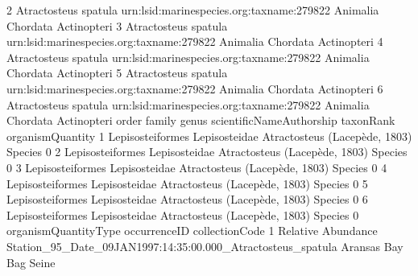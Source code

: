 \documentclass[
]{book}
\newenvironment{Shaded}{\begin{snugshade}}{\end{snugshade}}
\newcommand{\DecValTok}[1]{\textcolor[rgb]{0.00,0.00,0.81}{#1}}
\newcommand{\FloatTok}[1]{\textcolor[rgb]{0.00,0.00,0.81}{#1}}
\newcommand{\FunctionTok}[1]{\textcolor[rgb]{0.00,0.00,0.00}{#1}}
\newcommand{\NormalTok}[1]{#1}
\newcommand{\SpecialCharTok}[1]{\textcolor[rgb]{0.00,0.00,0.00}{#1}}
\begin{document}
\begin{Shaded}
\begin{Highlighting}[]
\DecValTok{2}\NormalTok{ Atractosteus spatula urn}\SpecialCharTok{:}\NormalTok{lsid}\SpecialCharTok{:}\NormalTok{marinespecies.org}\SpecialCharTok{:}\NormalTok{taxname}\SpecialCharTok{:}\DecValTok{279822}\NormalTok{ Animalia Chordata Actinopteri}
\DecValTok{3}\NormalTok{ Atractosteus spatula urn}\SpecialCharTok{:}\NormalTok{lsid}\SpecialCharTok{:}\NormalTok{marinespecies.org}\SpecialCharTok{:}\NormalTok{taxname}\SpecialCharTok{:}\DecValTok{279822}\NormalTok{ Animalia Chordata Actinopteri}
\DecValTok{4}\NormalTok{ Atractosteus spatula urn}\SpecialCharTok{:}\NormalTok{lsid}\SpecialCharTok{:}\NormalTok{marinespecies.org}\SpecialCharTok{:}\NormalTok{taxname}\SpecialCharTok{:}\DecValTok{279822}\NormalTok{ Animalia Chordata Actinopteri}
\DecValTok{5}\NormalTok{ Atractosteus spatula urn}\SpecialCharTok{:}\NormalTok{lsid}\SpecialCharTok{:}\NormalTok{marinespecies.org}\SpecialCharTok{:}\NormalTok{taxname}\SpecialCharTok{:}\DecValTok{279822}\NormalTok{ Animalia Chordata Actinopteri}
\DecValTok{6}\NormalTok{ Atractosteus spatula urn}\SpecialCharTok{:}\NormalTok{lsid}\SpecialCharTok{:}\NormalTok{marinespecies.org}\SpecialCharTok{:}\NormalTok{taxname}\SpecialCharTok{:}\DecValTok{279822}\NormalTok{ Animalia Chordata Actinopteri}
\NormalTok{             order        family        genus scientificNameAuthorship taxonRank organismQuantity}
\DecValTok{1}\NormalTok{ Lepisosteiformes Lepisosteidae }\FunctionTok{Atractosteus}\NormalTok{         (Lacepède, }\DecValTok{1803}\NormalTok{)   Species                }\DecValTok{0}
\DecValTok{2}\NormalTok{ Lepisosteiformes Lepisosteidae }\FunctionTok{Atractosteus}\NormalTok{         (Lacepède, }\DecValTok{1803}\NormalTok{)   Species                }\DecValTok{0}
\DecValTok{3}\NormalTok{ Lepisosteiformes Lepisosteidae }\FunctionTok{Atractosteus}\NormalTok{         (Lacepède, }\DecValTok{1803}\NormalTok{)   Species                }\DecValTok{0}
\DecValTok{4}\NormalTok{ Lepisosteiformes Lepisosteidae }\FunctionTok{Atractosteus}\NormalTok{         (Lacepède, }\DecValTok{1803}\NormalTok{)   Species                }\DecValTok{0}
\DecValTok{5}\NormalTok{ Lepisosteiformes Lepisosteidae }\FunctionTok{Atractosteus}\NormalTok{         (Lacepède, }\DecValTok{1803}\NormalTok{)   Species                }\DecValTok{0}
\DecValTok{6}\NormalTok{ Lepisosteiformes Lepisosteidae }\FunctionTok{Atractosteus}\NormalTok{         (Lacepède, }\DecValTok{1803}\NormalTok{)   Species                }\DecValTok{0}
\NormalTok{  organismQuantityType                                                occurrenceID        collectionCode}
\DecValTok{1}\NormalTok{   Relative Abundance Station\_95\_Date\_09JAN1997}\SpecialCharTok{:}\DecValTok{14}\SpecialCharTok{:}\DecValTok{35}\SpecialCharTok{:}\FloatTok{00.000}\NormalTok{\_Atractosteus\_spatula Aransas Bay Bag Seine}

\end{Highlighting}
\end{Shaded}
\end{document}
